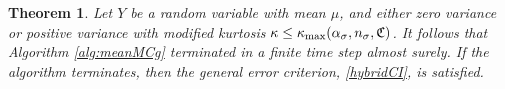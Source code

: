 \documentclass{iitthesis}
\newtheorem{theorem}{Theorem}[section]
\newtheorem{lemma}[theorem]{Lemma}
\theoremstyle{definition}
\begin{document}
\begin{theorem}\label{thm:meanMCg}
Let $Y$ be a random variable with mean $\mu$, and either zero variance or positive variance with modified kurtosis $\kappa \leq \kappa_{\max}(\alpha_\sigma, n_\sigma, \mathfrak{C})$. It follows that Algorithm \ref{alg:meanMCg} terminated in a finite time step almost surely. If the algorithm terminates, then the general error criterion, \eqref{hybridCI}, is satisfied.
\end{theorem}
\end{document}
